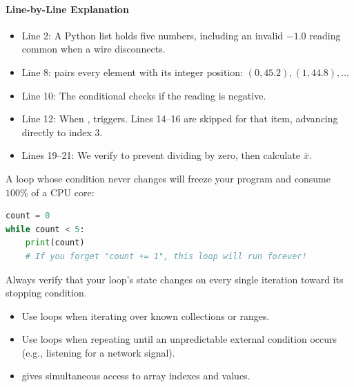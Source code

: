 \paragraph{Line-by-Line Explanation}
\begin{itemize}
    \item Line 2: A Python list holds five numbers, including an invalid $-1.0$ reading common when a wire disconnects.
    \item Line 8:  pairs every element with its integer position: $(0, 45.2), (1, 44.8), \dots$
    \item Line 10: The conditional checks if the reading is negative.
    \item Line 12: When ,  triggers. Lines 14--16 are skipped for that item, advancing directly to index 3.
    \item Lines 19--21: We verify  to prevent dividing by zero, then calculate $\bar{x}$.
\end{itemize}

\begin{warning}
A  loop whose condition never changes will freeze your program and consume $100\%$ of a CPU core:
\begin{lstlisting}[language=Python]
count = 0
while count < 5:
    print(count)
    # If you forget "count += 1", this loop will run forever!
\end{lstlisting}
Always verify that your loop's state changes on every single iteration toward its stopping condition.
\end{warning}

\begin{takeaways}
\begin{itemize}
    \item Use  loops when iterating over known collections or ranges.
    \item Use  loops when repeating until an unpredictable external condition occurs (e.g., listening for a network signal).
    \item {} gives simultaneous access to array indexes and values.
\end{itemize}
\end{takeaways}

